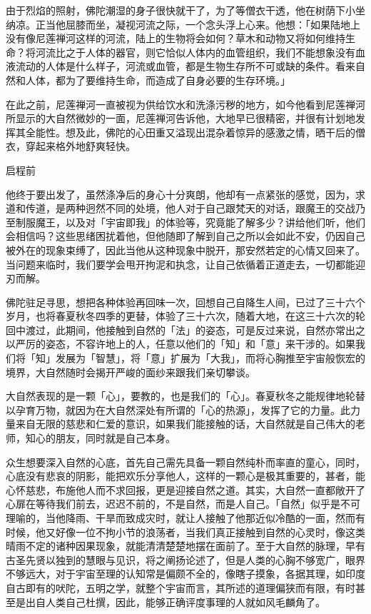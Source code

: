 \documentclass[12pt,twoside,openany]{book}
\begin{document}
由于烈焰的照射，佛陀潮湿的身子很快就干了，为了等僧衣干透，他在树荫下小坐纳凉。正当他屈膝而坐，凝视河流之际，一个念头浮上心来。他想：「如果陆地上没有像尼莲禅河这样的河流，陆上的生物将会如何？草木和动物又将如何维持生命？将河流比之于人体的器官，则它恰似人体内的血管组织，我们不能想象没有血液流动的人体是什么样子，河流或血管，都是生物生存所不可或缺的条件。看来自然和人体，都为了要维持生命，而造成了自身必要的生存环境。」

在此之前，尼莲禅河一直被视为供给饮水和洗涤污秽的地方，如今他看到尼莲禅河所显示的大自然微妙的一面，尼莲禅河告诉他，大地早已很精密，并很有计划地发挥其全能性。想及此，佛陀的心田重又溢现出混杂着惊异的感激之情，晒干后的僧衣，穿起来格外地舒爽轻快。

启程前

他终于要出发了，虽然涤净后的身心十分爽朗，他却有一点紧张的感觉，因为，求道和传道，是两种迥然不同的处境，他人对于自己跟梵天的对话，跟魔王的交战乃至制服魔王，以及对「宇宙即我」的体验等，究竟能了解多少？讲给他们听，他们会相信吗？这些思绪困扰着他，但他随即了解到自己之所以会如此不安，仍因自己被外在的现象束缚了，因此当他从这种现象中脱开，那安然若定的心情又回来了。当问题来临时，我们要学会甩开拘泥和执念，让自己依循着正道走去，一切都能迎刃而解。

佛陀驻足寻思，想把各种体验再回味一次，回想自己自降生人间，已过了三十六个岁月，也将春夏秋冬四季的更替，体验了三十六次，随着大地，在这三十六次的轮回中渡过，此期间，他接触到自然的「法」的姿态，可是反过来说，自然亦常出之以严厉的姿态，不容许地上的人，任意以他们的「知」和「意」来干涉的。如果我们将「知」发展为「智慧」，将「意」扩展为「大我」，而将心胸推至宇宙般恢宏的境界，大自然随时会揭开严峻的面纱来跟我们亲切攀谈。

大自然表现的是一颗「心」，要教的，也是我们的「心」。春夏秋冬之能规律地轮替以孕育万物，就因为在大自然深处有所谓的「心的热源」，发挥了它的力量。此力量来自无限的慈悲和仁爱的意识，如果我们能接触的话，大自然就是自己伟大的老师，知心的朋友，同时就是自己本身。

众生想要深入自然的心底，首先自己需先具备一颗自然纯朴而率直的童心，同时，心底没有悲哀的阴影，能把欢乐分享他人，这样的一颗心是极其重要的，甚者，能心怀慈悲，布施他人而不求回报，更是迎接自然之道。其实，大自然一直都敞开了心扉在等待我们前去，迟迟不前的，不是自然，而是人自己。「自然」似乎是不可理喻的，当他降雨、干旱而致成灾时，就让人接触了他那近似冷酷的一面，然而有时候，他又好像一位不拘小节的浪荡者，当我们真正接触到自然的心灵时，像这类晴雨不定的诸种因果现象，就能清清楚楚地摆在面前了。至于大自然的脉理，早有古圣先贤以独到的慧眼与见识，将之阐扬论述了，但是人类的心胸不够宽广，眼界不够远大，对于宇宙至理的认知常是偏颇不全的，像瞎子摸象，各据其理，如印度自古即有的吠陀，五明之学，就整个宇宙而言，其所述的道理偏狭而有限，有时甚至是出自人类自己杜撰，因此，能够正确评度事理的人就如风毛麟角了。
\end{document}
